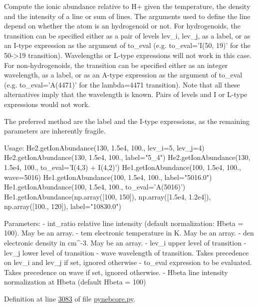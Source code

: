 \begin{DoxyVerb}Compute the ionic abundance relative to H+ given the temperature, the density and the 
    intensity of a line or sum of lines.
The arguments used to define the line depend on whether the atom is an hydrogenoid or not. 
For hydrogenoids, the transition can be specified either as a pair of levels 
    lev_i, lev_j, as a label, or as an I-type expression as the argument of to_eval 
    (e.g. to_eval='I(50, 19)' for the 50->19 transition). Wavelengths or L-type expressions 
    will not work in this case. 
For non-hydrogenoids, the transition can be specified either as an integer wavelength, 
    as a label, or as an A-type expression as the argument of to_eval (e.g. to_eval='A(4471)' 
    for the lambda=4471 transition). Note that all these alternatives imply that the wavelength
    is known. Pairs of levels and I or L-type expressions would not work.

The preferred method are the label and the I-type expressions, as the remaining parameters 
    are inherently fragile.

Usage:
    He2.getIonAbundance(130, 1.5e4, 100., lev_i=5, lev_j=4)
    He2.getIonAbundance(130, 1.5e4, 100., label="5_4")
    He2.getIonAbundance(130, 1.5e4, 100., to_eval='I(4,3) + I(4,2)')
    He1.getIonAbundance(100, 1.5e4, 100., wave=5016)
    He1.getIonAbundance(100, 1.5e4, 100., label="5016.0")
    He1.getIonAbundance(100, 1.5e4, 100., to_eval='A(5016)')
    He1.getIonAbundance(np.array([100, 150]), np.array([1.5e4, 1.2e4]), np.array([100., 120]), 
label="10830.0")
    
Parameters:
    - int_ratio    relative line intensity (default normalization: Hbeta = 100). 
            May be an array.
    - tem          electronic temperature in K. May be an array.
    - den          electronic density in cm^-3. May be an array.
    - lev_i        upper level of transition
    - lev_j        lower level of transition
    - wave         wavelength of transition. Takes precedence on lev_i and lev_j if set, 
            ignored otherwise 
    - to_eval      expression to be evaluated. Takes precedence on wave if set, 
            ignored otherwise.
    - Hbeta        line intensity normalization at Hbeta (default Hbeta = 100)\end{DoxyVerb}
 

Definition at line \hyperlink{pynebcore_8py_source_l03083}{3083} of file \hyperlink{pynebcore_8py_source}{pynebcore.\-py}.




